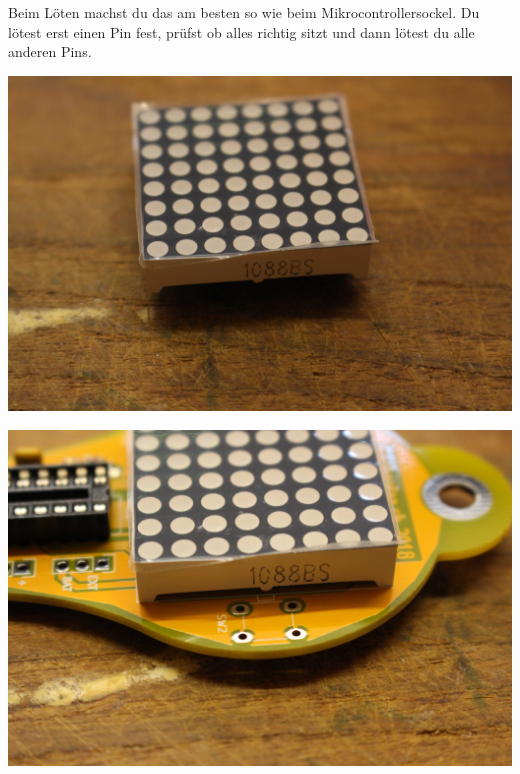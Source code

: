 \documentclass{article}
\begin{document}
Beim Löten machst du das am besten so wie beim Mikrocontrollersockel. Du lötest erst einen Pin fest, prüfst ob alles richtig sitzt und dann lötest du alle anderen Pins.

\vspace{1cm}

\begin{minipage}[b]{0.5\textwidth}
	\includegraphics[width=\textwidth]{Bilder/IMG_5577.JPG}
\end{minipage}
\begin{minipage}[b]{0.5\textwidth}
	\includegraphics[width=\textwidth]{Bilder/IMG_5578.JPG}
\end{minipage}

\vspace{0.5cm}
\end{document}
